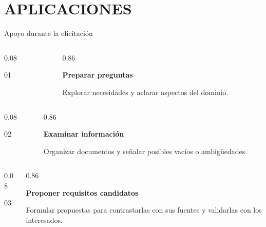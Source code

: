 \documentclass[aspectratio=169,12pt]{beamer}
\newcommand{\texto}[1]{{\fontsize{11}{14}\selectfont #1\par}}
\newcommand{\fuentesactuales}{}
\newcommand{\fuentesdiapositiva}[1]{\gdef\fuentesactuales{#1}}
\begin{document}
\section{APLICACIONES}
\begin{frame}[t]{Apoyo durante la elicitación}
\fuentesdiapositiva{\cite{cheng2026genai} Cheng et al., 2026\qquad
  \cite{arora2024advancing} Arora et al., 2024}
\vspace{1mm}
\begin{columns}[T,onlytextwidth]
\begin{column}{0.08\textwidth}{\fontsize{20}{24}\selectfont\color{Accent}01\par}\end{column}
\begin{column}{0.86\textwidth}{\large\bfseries Preparar preguntas\par}\texto{Explorar necesidades y aclarar aspectos del dominio.}\end{column}
\end{columns}
\vspace{5mm}
\begin{columns}[T,onlytextwidth]
\begin{column}{0.08\textwidth}{\fontsize{20}{24}\selectfont\color{Accent}02\par}\end{column}
\begin{column}{0.86\textwidth}{\large\bfseries Examinar información\par}\texto{Organizar documentos y señalar posibles vacíos o ambigüedades.}\end{column}
\end{columns}
\vspace{5mm}
\begin{columns}[T,onlytextwidth]
\begin{column}{0.08\textwidth}{\fontsize{20}{24}\selectfont\color{Accent}03\par}\end{column}
\begin{column}{0.86\textwidth}{\large\bfseries Proponer requisitos candidatos\par}\texto{Formular propuestas para contrastarlas con sus fuentes y validarlas con los interesados.}\end{column}
\end{columns}
\vfill
\vspace{2mm}
\end{frame}
\end{document}
